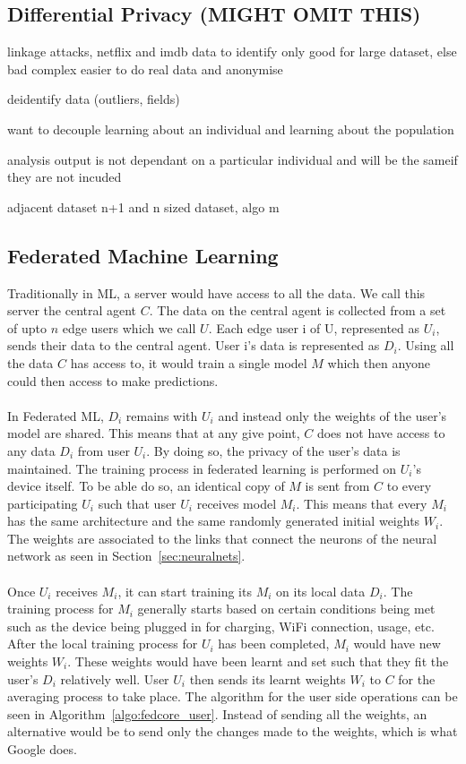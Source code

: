 \documentclass[12pt]{article}
\begin{document}
\subsection{Differential Privacy (MIGHT OMIT THIS)}
linkage attacks, netflix and imdb data to identify
only good for large dataset, else bad 
	complex
	easier to do real data and anonymise 

deidentify data (outliers, fields)
 	
want to decouple learning about an individual and learning about the population

analysis output is not dependant on a particular individual and will be the sameif they are not incuded

adjacent dataset
	n+1 and n sized dataset, algo m
\subsection{Federated Machine Learning}\label{subsec:fedml}
Traditionally in ML, a server would have access to all the data. We call this server the central agent $C$. The data on the central agent is collected from a set of upto $n$ edge users which we call $U$. Each edge user i of U, represented as $U_i$, sends their data to the central agent. User i's data is represented as $D_i$. Using all the data $C$ has access to, it would train a single model $M$ which then anyone could then access to make predictions. 
\\\\
In Federated ML, $D_i$ remains with $U_i$ and instead only the weights of the user's model are shared. This means that at any give point, $C$ does not have access to any data $D_i$ from user $U_i$. By doing so, the privacy of the user's data is maintained. The training process in federated learning is performed on $U_i$'s device itself. To be able do so, an identical copy of $M$ is sent from $C$ to every participating $U_i$ such that user $U_i$ receives model $M_i$. This means that every $M_i$ has the same architecture and the same randomly generated initial weights $W_i$. The weights are associated to the links that connect the neurons of the neural network as seen in Section~\ref{sec:neuralnets}.
\\\\
Once $U_i$ receives $M_i$, it can start training its $M_i$ on its local data $D_i$. The training process for $M_i$ generally starts based on certain conditions being met such as the device being plugged in for charging, WiFi connection, usage, etc. After the local training process for $U_i$ has been completed, $M_i$ would have new weights $W_i$. These weights would have been learnt and set such that they fit the user's $D_i$ relatively well. User $U_i$ then sends its learnt weights $W_i$ to $C$ for the averaging process to take place. The algorithm for the user side operations can be seen in Algorithm~\ref{algo:fedcore_user}. Instead of sending all the weights, an alternative would be to send only the changes made to the weights, which is what Google does.
\end{document}
